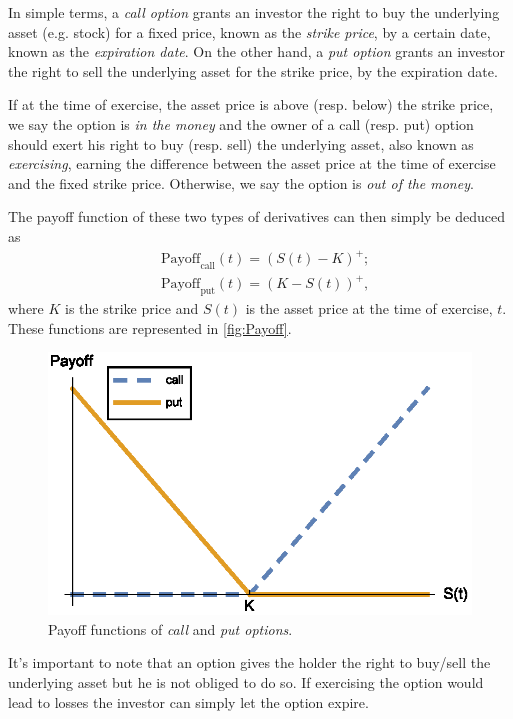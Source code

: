 \documentclass[a4paper,twocolumn,aps,prd,longbibliography,superscriptaddress]{revtex4-1}
\begin{document}
In simple terms, a \textit{call option} grants an investor the right to buy the underlying asset (e.g. stock) for a fixed price, known as the \textit{strike price}, by a certain date, known as the \textit{expiration date}.
On the other hand, a \textit{put option} grants an investor the right to sell the underlying asset for the strike price, by the expiration date.

If at the time of exercise, the asset price is above (resp. below) the strike price, we say the option is \textit{in the money} and the owner of a call (resp. put) option should exert his right to buy (resp. sell) the underlying asset, also known as \textit{exercising}, earning the difference between the asset price at the time of exercise and the fixed strike price. Otherwise, we say the option is \textit{out of the money}.

The payoff function of these two types of derivatives can then simply be deduced as
\begin{equation}\label{callput}
\begin{split}
&\text{Payoff}_\text{call}(t)=(S(t)-K)^+;\\
&\text{Payoff}_\text{put}(t)=(K-S(t))^+,
\end{split}
\end{equation}
\noindent where $K$ is the strike price and $S(t)$ is the asset price at the time of exercise, $t$. These functions are represented in \autoref{fig:Payoff}.

\begin{figure}[H]
    \centering
      \includegraphics[width=.9\columnwidth]{Payoff.eps}
      \caption{Payoff functions of \textit{call} and \textit{put options}.}\label{fig:Payoff}
    \end{figure}

It's important to note that an option gives the holder the right to buy/sell the underlying asset but he is not obliged to do so. If exercising the option would lead to losses the investor can simply let the option expire.
\end{document}

